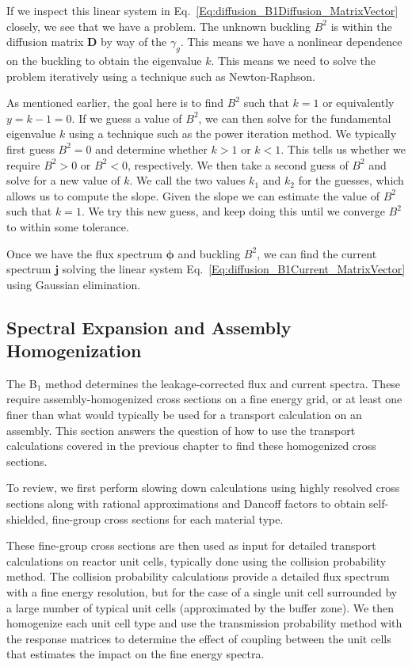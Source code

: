 If we inspect this linear system in Eq.~\eqref{Eq:diffusion_B1Diffusion_MatrixVector} closely, we see that we have a problem. The unknown buckling $B^2$ is within the diffusion matrix $\mathbf{D}$ by way of the $\gamma_g$. This means we have a nonlinear dependence on the buckling to obtain the eigenvalue $k$. This means we need to solve the problem iteratively using a technique such as Newton-Raphson.

As mentioned earlier, the goal here is to find $B^2$ such that $k = 1$ or equivalently $y = k - 1 = 0$. If we guess a value of $B^2$, we can then solve for the fundamental eigenvalue $k$ using a technique such as the power iteration method. We typically first guess $B^2 = 0$ and determine whether $k > 1$ or $k < 1$. This tells us whether we require $B^2 > 0$ or $B^2 < 0$, respectively. We then take a second guess of $B^2$ and solve for a new value of $k$. We call the two values $k_1$ and $k_2$ for the guesses, which allows us to compute the slope. Given the slope we can estimate the value of $B^2$ such that $k = 1$. We try this new guess, and keep doing this until we converge $B^2$ to within some tolerance.

Once we have the flux spectrum $\boldsymbol\phi$ and buckling $B^2$, we can find the current spectrum $\mathbf{j}$ solving the linear system Eq.~\eqref{Eq:diffusion_B1Current_MatrixVector} using Gaussian elimination. 




\subsection{Spectral Expansion and Assembly Homogenization}

The B$_1$ method determines the leakage-corrected flux and current spectra. These require assembly-homogenized cross sections on a fine energy grid, or at least one finer than what would typically be used for a transport calculation on an assembly. This section answers the question of how to use the transport calculations covered in the previous chapter to find these homogenized cross sections.

To review, we first perform slowing down calculations using highly resolved cross sections along with rational approximations and Dancoff factors to obtain self-shielded, fine-group cross sections for each material type. 

These fine-group cross sections are then used as input for detailed transport calculations on reactor unit cells, typically done using the collision probability method. The collision probability calculations provide a detailed flux spectrum with a fine energy resolution, but for the case of a single unit cell surrounded by a large number of typical unit cells (approximated by the buffer zone). We then homogenize each unit cell type and use the transmission probability method with the response matrices to determine the effect of coupling between the unit cells that estimates the impact on the fine energy spectra.

